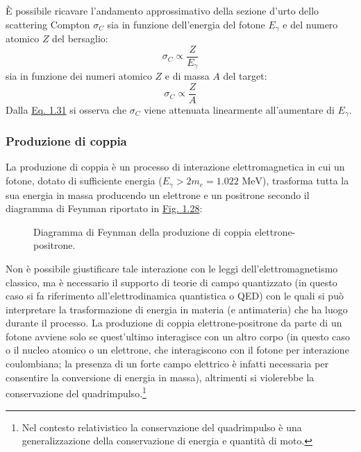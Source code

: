 \documentclass[12pt,a4paper,twoside]{report}
\begin{document}
	\`E possibile ricavare l'andamento approssimativo della sezione d'urto dello scattering Compton $\sigma_{C}$ sia in funzione dell'energia del fotone $E_\gamma$ e del numero atomico $Z$ del bersaglio:
	\begin{equation}
		\sigma_{C}\propto \frac{Z}{E_\gamma}
		\label{eq:sigma_c1}
	\end{equation}
	sia in funzione dei numeri atomico $Z$ e di massa $A$ del target:
	\begin{equation}
		\sigma_{C}\propto \frac{Z}{A}
		\label{eq:sigma_c2}
	\end{equation}
	Dalla \hyperref[eq:sigma_c1]{Eq. 1.31} si osserva che $\sigma_{C}$ viene attenuata linearmente all'aumentare di $E_\gamma$.
	
	\subsubsection{Produzione di coppia}
	La produzione di coppia è un processo di interazione elettromagnetica in cui un fotone, dotato di sufficiente energia ($E_\gamma>2m_e=1.022\mbox{ MeV}$), trasforma tutta la sua energia in massa producendo un elettrone e un positrone secondo il diagramma di Feynman riportato in \hyperref[fig:feynman]{Fig. 1.28}:
	\begin{figure}
		\centering
		\caption{Diagramma di Feynman della produzione di coppia elettrone-positrone.}
		\label{fig:feynman}
	\end{figure}
	Non è possibile giustificare tale interazione con le leggi dell'elettromagnetismo classico, ma è necessario il supporto di teorie di campo quantizzato (in questo caso si fa riferimento all'elettrodinamica quantistica o QED) con le quali si può interpretare la trasformazione di energia in materia (e antimateria) che ha luogo durante il processo. La produzione di coppia elettrone-positrone da parte di un fotone avviene solo se quest'ultimo interagisce con un altro corpo (in questo caso o il nucleo atomico o un elettrone, che interagiscono con il fotone per interazione coulombiana; la presenza di un forte campo elettrico è infatti necessaria per consentire la conversione di energia in massa), altrimenti si violerebbe la conservazione del quadrimpulso.\footnote{Nel contesto relativistico la conservazione del quadrimpulso è una generalizzazione della conservazione di energia e quantità di moto.}
	
\end{document}
